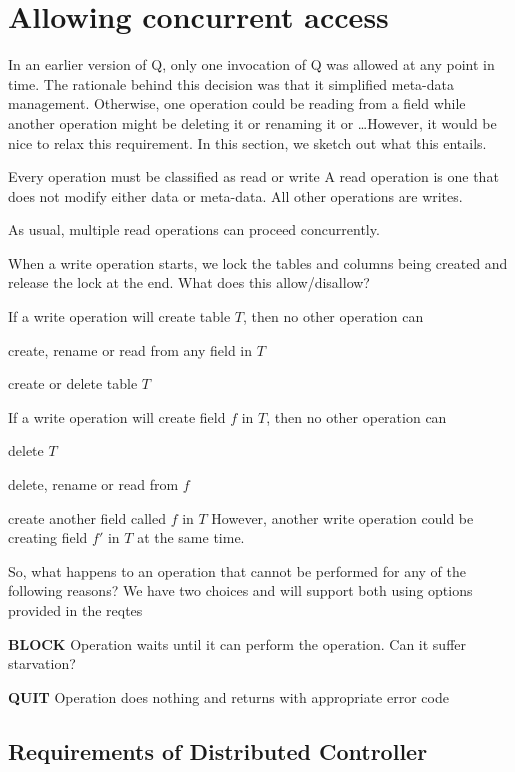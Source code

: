 \section{Allowing concurrent access}

In an earlier version of Q, only one invocation of Q was allowed at any
point in time. The rationale behind this decision was that it simplified
meta-data management. Otherwise, one operation could be reading from a
field while another operation might be deleting it or renaming it or
\ldots However, it would be nice to relax this requirement. In this
section, we sketch out what this entails.

Every operation must be classified as read or write
A read operation is one that does not modify either data or meta-data.
All other operations are writes.

As usual, multiple read operations can proceed concurrently.

When a write operation starts, we lock the tables and columns being
created and release the lock at the end. What does this allow/disallow?

\be
\item If a write operation will create table \(T\), then no
other operation can 
\be
\item create, rename or read from any field in \(T\)
\item create or delete table \(T\)
\ee

\item If a write operation will create field  \(f\) in \(T\), then no
other operation can 
\be
\item delete \(T\) 
\item delete, rename or read from \(f\) 
\item create another field called \(f\) in \(T\)
\ee
However, another write operation could be creating field \(f'\) in \(T\) at the same time.
\ee

So, what happens to an operation that cannot be performed for any of the
following reasons? We have two choices and will support both using
options provided in the reqtes
\be
\item {\bf BLOCK} Operation waits until it can perform the
operation. Can it suffer starvation? \TBC
\item {\bf QUIT}  Operation does nothing and returns with appropriate error
code
\ee

\subsection{Requirements of Distributed Controller}

